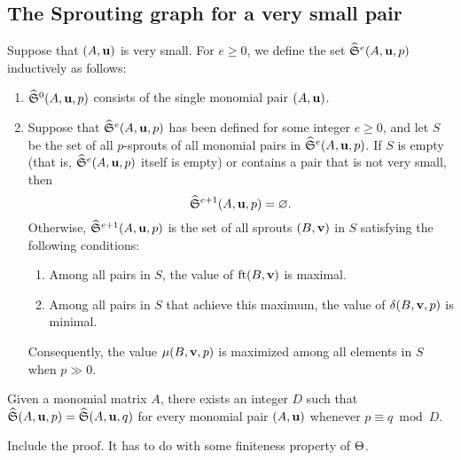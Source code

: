 \documentclass[11pt]{amsart}
\begin{document}
\subsection{The Sprouting graph for a very small pair}
\begin{definition}
   Suppose that $(A, \mathbf{u})$ is very small.
   For $e \geq 0$, we define the set $\widehat{\mathfrak{S}}^e(A,\mathbf{u},p)$ inductively as follows:
\begin{enumerate}
\item $\widehat{\mathfrak{S}}^0(A, \mathbf{u}, p)$ consists of the single monomial pair $(A, \mathbf{u})$.
\item Suppose that $\widehat{\mathfrak{S}}^e(A, \mathbf{u}, p)$ has been defined for some integer $e \geq 0$, and let $S$ be the set of all $p$-sprouts of all monomial pairs in $\widehat{\mathfrak{S}}^e(A, \mathbf{u}, p)$.
If  $S$ is empty (that is, $\widehat{\mathfrak{S}}^e(A, \mathbf{u}, p)$ itself is empty) or contains a pair that is not very small, then \[ \widehat{\mathfrak{S}}^{e+1}(A, \mathbf{u}, p) = \varnothing.\]  
Otherwise, $\widehat{\mathfrak{S}}^{e+1}(A, \mathbf{u}, p)$ is the set of all sprouts $(B, \mathbf{v})$ in $S$ satisfying the following conditions:    

\begin{enumerate}
\item Among all pairs in $S$, the value of  $\operatorname{ft}(B, \mathbf{v})$ is maximal.
\item Among all pairs in $S$ that achieve this maximum, the value of $\delta(B, \mathbf{v}, p)$ is minimal.
\end{enumerate}
Consequently, the value $\mu(B, \mathbf{v},p)$ is maximized among all elements in $S$ when $p \gg 0$. 
\end{enumerate}
\end{definition}


\begin{proposition}
   Given a monomial matrix $A$, there exists an integer $D$ such that $\widehat{\mathfrak{S}}(A, \mathbf{u}, p) = \widehat{\mathfrak{S}}(A, \mathbf{u}, q)$ for every monomial pair $(A, \mathbf{u})$ whenever $p \equiv q \bmod D$.
\end{proposition}

\alert[inline]{Include the proof.  It has to do with some finiteness property of $\Theta$.}


\end{document}
